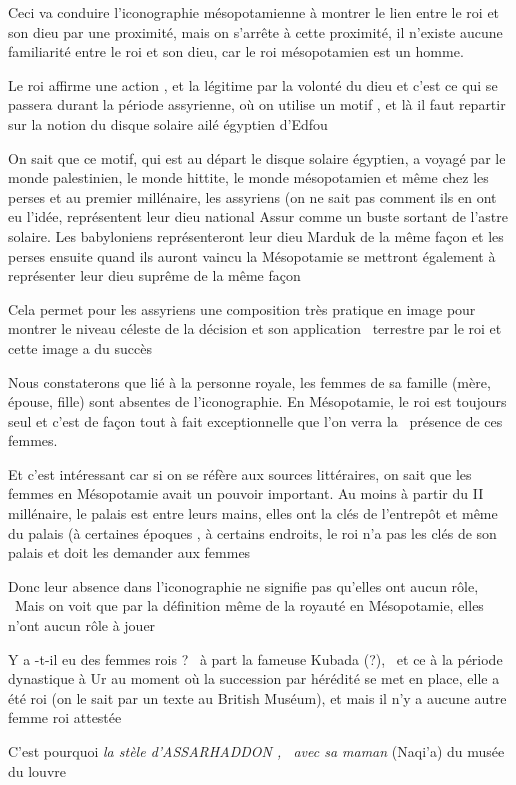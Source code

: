 \documentclass[a4paper]{article}
\begin{document}
Ceci va conduire l'iconographie mésopotamienne à montrer le lien entre le roi et son dieu par une proximité, mais on
s'arrête à cette proximité, il n'existe aucune familiarité entre le roi et son dieu, car le roi mésopotamien est un
homme.

Le roi affirme une action , et la légitime par la volonté du dieu et c'est ce qui se passera durant la période
assyrienne, où on utilise un motif , et là il faut repartir sur la notion du disque solaire ailé égyptien d'Edfou


On sait que ce motif, qui est au départ le disque solaire égyptien, a voyagé par le monde palestinien, le monde hittite,
le monde mésopotamien et même chez les perses et au premier millénaire, les assyriens (on ne sait pas comment ils en
ont eu l'idée, représentent leur dieu national Assur comme un buste sortant de l'astre solaire. Les babyloniens
représenteront leur dieu Marduk de la même façon et les perses ensuite quand ils auront vaincu la Mésopotamie se
mettront également à représenter leur dieu suprême de la même façon

Cela permet pour les assyriens une composition très pratique en image pour montrer le niveau céleste de la décision et
son application \ terrestre par le roi et cette image a du succès


Nous constaterons que lié à la personne royale, les femmes de sa famille (mère, épouse, fille) sont absentes de
l'iconographie. En Mésopotamie, le roi est toujours seul et c'est de façon tout à fait exceptionnelle que l'on verra la
\ présence de ces femmes.


Et c'est intéressant car si on se réfère aux sources littéraires, on sait que les femmes en Mésopotamie avait un pouvoir
important. Au moins à partir du II millénaire, le palais est entre leurs mains, elles ont la clés de l'entrepôt et même
du palais (à certaines époques , à certains endroits, le roi n'a pas les clés de son palais et doit les demander aux
femmes


Donc leur absence dans l'iconographie ne signifie pas qu'elles ont aucun rôle, \ Mais on voit que par la définition même
de la royauté en Mésopotamie, elles n'ont aucun rôle à jouer


Y a -t-il eu des femmes rois ? \ à part la fameuse Kubada (?), \ et ce à la période dynastique à Ur au moment où la
succession par hérédité se met en place, elle a été roi (on le sait par un texte au British Muséum), et mais il n'y a
aucune autre femme roi attestée


C'est pourquoi \textit{la stèle d'ASSARHADDON , \ avec sa maman} (Naqi'a) du musée du louvre
\end{document}
